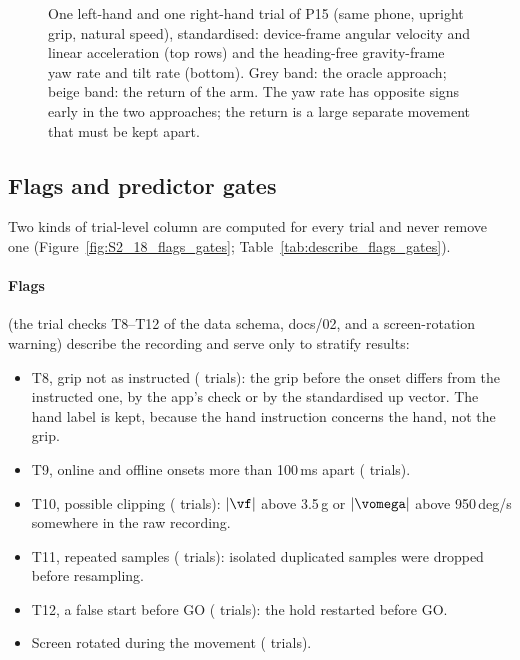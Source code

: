 \begin{figure}[htbp]
\centering
{}
\caption{One left-hand and one right-hand trial of P15 (same phone, upright grip, natural speed),
standardised: device-frame angular velocity and linear acceleration (top rows) and the heading-free
gravity-frame yaw rate and tilt rate (bottom). Grey band: the oracle approach; beige band: the return of the
arm. The yaw rate has opposite signs early in the two approaches; the return is a large separate movement that
must be kept apart.}
\label{fig:S2_10_example_traces}
\end{figure}

\subsection{Flags and predictor gates}\label{app:data:flags}

Two kinds of trial-level column are computed for every trial and never remove one
(Figure~\ref{fig:S2_18_flags_gates}; Table~\ref{tab:describe_flags_gates}).

\paragraph{Flags} (the trial checks T8--T12 of the data schema, docs/02, and a screen-rotation warning) describe
the recording and serve only to stratify results:
\begin{itemize}[nosep]
  \item T8, grip not as instructed ( trials): the grip before the onset differs
    from the instructed one, by the app's check or by the standardised up vector. The hand label is kept,
    because the hand instruction concerns the hand, not the grip.
  \item T9, online and offline onsets more than 100\,ms apart ( trials).
  \item T10, possible clipping ( trials): $|\vf|$ above 3.5\,g or $|\vomega|$
    above 950\,deg/s somewhere in the raw recording.
  \item T11, repeated samples ( trials): isolated duplicated samples were
    dropped before resampling.
  \item T12, a false start before GO ( trials): the hold restarted before GO.
  \item Screen rotated during the movement ( trials).
\end{itemize}

